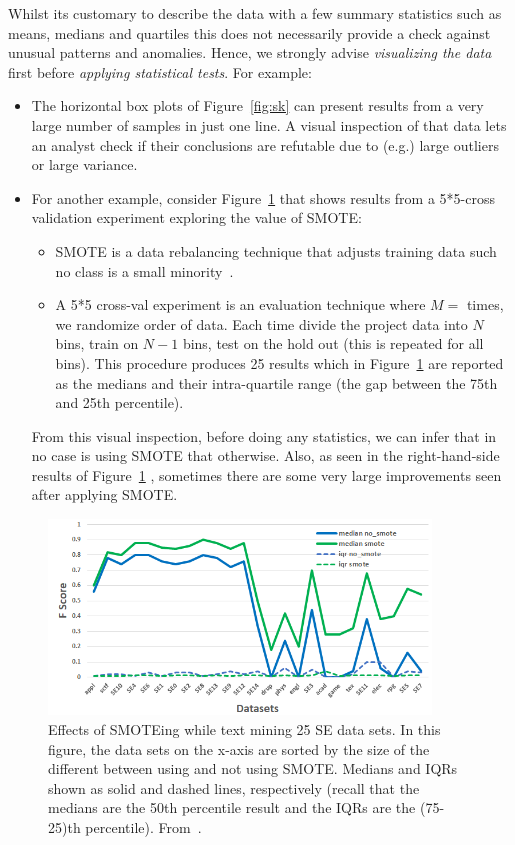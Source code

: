 \documentclass[preprint,10pt]{elsarticle}
\newcommand{\bi}{\begin{itemize}}
\newcommand{\ei}{\end{itemize}}
\newcommand{\RED}{\color{red}}
\newcommand{\BLACK}{\color{black}}
\begin{document}
Whilst its customary to describe the data with a few summary statistics such as means, medians and quartiles this does not necessarily provide a check against unusual patterns and anomalies. \RED
Hence, we strongly advise {\em visualizing the data} first before {\em applying statistical tests}. 
For example:
\bi
\item
The horizontal box plots of  Figure~\ref{fig:sk} can  present results from a very large number of samples in just one line.
A visual inspection of that data lets an analyst check if their conclusions are refutable due to (e.g.) large outliers or large variance.
\item
For another example, consider Figure~\ref{fig:irqs}  that shows results from a 5*5-cross validation experiment 
exploring the value of   SMOTE:
\bi
\item
SMOTE is a data rebalancing technique that adjusts training
data such no class is a small minority~\cite{agrawal18}.
\item
A 5*5 cross-val experiment is an evaluation technique where $M=$ times, we randomize order of data. Each time
divide the project data into $N$ bins, train on $N−1$ bins, test on the hold out (this is repeated for all bins). This procedure produces 25 results which in Figure~\ref{fig:irqs} are reported as the
medians and their intra-quartile range (the gap between the 75th and 25th percentile).
\ei
From this visual inspection,
before doing any statistics, we can infer that in no case is using SMOTE that otherwise. Also, as seen in the right-hand-side results of Figure~\ref{fig:irqs} ,
sometimes there   are some very large improvements seen after applying SMOTE. 
\ei
\BLACK
\begin{figure}[!b]
\begin{center}
\includegraphics[width=4in]{fig/pic02.png}
\end{center}
\caption{\RED Effects of SMOTEing  while   text mining  25 SE data sets.  In this figure, the data sets on the x-axis are sorted by the size of the different between using and not using SMOTE.
  Medians and IQRs shown as solid and dashed lines, respectively (recall that the medians are the 50th percentile result
and the IQRs are the (75-25)th percentile). From~\cite{Krishna2016TheP}.
\BLACK}\label{fig:irqs}
\end{figure}
\end{document}
